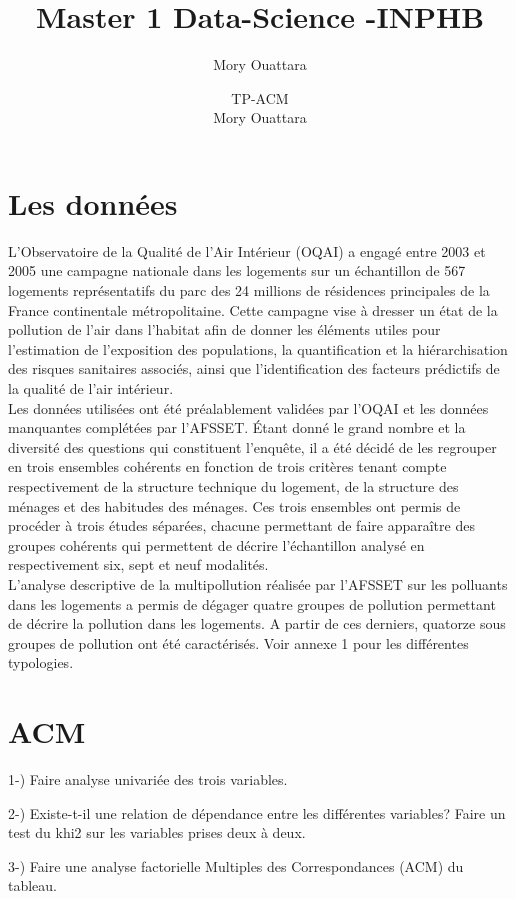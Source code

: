 \documentclass[16pt,a4paper]{article}
\author{Mory Ouattara}
\title{Master 1 Data-Science -INPHB }
\author{TP-ACM\\
Mory Ouattara}
\date{}
\begin{document}
\maketitle 
\thispagestyle{empty}

\section{Les données}

 
L'Observatoire de la Qualité de l'Air Intérieur (OQAI) a engagé entre 2003 et 2005 une campagne nationale dans les logements sur un échantillon de 567 logements représentatifs du parc des 24 millions de résidences principales de la France continentale métropolitaine. Cette campagne vise à dresser un état de la pollution de l'air dans l'habitat afin de donner les éléments utiles pour l'estimation de l'exposition des populations, la quantification et la hiérarchisation des risques sanitaires associés, ainsi que l'identification des facteurs prédictifs de la qualité de l'air intérieur.\\

Les données utilisées ont été préalablement validées par l'OQAI et les données manquantes complétées par l'AFSSET. Étant donné le grand nombre et la diversité des questions qui constituent l'enquête, il a été décidé de les regrouper en trois ensembles cohérents en fonction de trois critères tenant compte respectivement de la structure technique du logement, de la structure des ménages et des habitudes des ménages. Ces trois ensembles ont permis de procéder à trois études séparées, chacune permettant de faire apparaître des groupes cohérents qui permettent de décrire l’échantillon analysé en respectivement six, sept et neuf modalités.\\

L’analyse descriptive de la multipollution réalisée par l’AFSSET sur les polluants dans les logements a permis de dégager quatre groupes de pollution permettant de décrire la pollution dans les logements. A partir de ces derniers, quatorze sous groupes de pollution ont été caractérisés.  Voir annexe 1 pour les différentes typologies.

\section{ACM} 

1-) Faire analyse univariée des trois variables.

2-) Existe-t-il une relation  de dépendance entre les différentes variables? Faire un test du khi2 sur les variables prises deux à deux.


3-) Faire une analyse factorielle Multiples des Correspondances (ACM) du tableau. 
       

 

\end{document}

